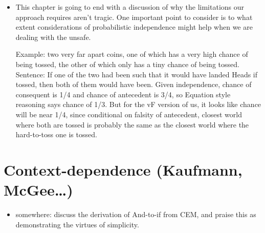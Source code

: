 \documentclass[leqno, 11pt, a5paper, openany]{article}
\begin{document}
\begin{itemize}
	\item 
	This chapter is going to end with a discussion of why the limitations our approach requires aren't tragic.  One important point to consider is to what extent considerations of probabilistic independence might help when we are dealing with the unsafe.  
	
	Example: two very far apart coins, one of which has a very high chance of being tossed, the other of which only has a tiny chance of being tossed.  Sentence: If one of the two had been such that it would have landed Heads if tossed, then both of them would have been.  Given independence, chance of consequent is 1/4 and chance of antecedent is 3/4, so Equation style reasoning says chance of 1/3.  But for the vF version of us, it looks like chance will be near 1/4, since conditional on falsity of antecedent, closest world where both are tossed is probably the same as the closest world where the hard-to-toss one is tossed.  
\end{itemize}

\section{Context-dependence (Kaufmann,
McGee\ldots{})}\label{context-dependence-kaufmann-mcgee}

\begin{itemize}
\item
  somewhere: discuss the derivation of And-to-if from CEM, and praise
  this as demonstrating the virtues of simplicity.
\end{itemize}
\end{document}
